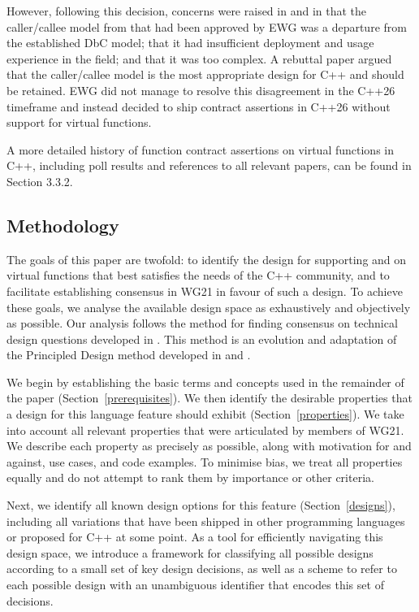 However, following this decision, concerns were raised in \cite{P3506R0} and in \cite{P3573R0} that the caller/callee model from \cite{P3097R0} that had been approved by EWG was a departure from the established DbC model; that it had insufficient deployment and usage experience in the field; and that it was too complex. A rebuttal paper \cite{P3506R0} argued that the caller/callee model is the most appropriate design for C++ and should be retained. EWG did not manage to resolve this disagreement in the C++26 timeframe and instead decided to ship contract assertions in C++26 without support for virtual functions.

A more detailed history of function contract assertions on virtual functions in C++, including poll results and references to all relevant papers, can be found in \cite{P2899R1} Section 3.3.2.

\subsection{Methodology}

The goals of this paper are twofold: to identify the design for supporting  and  on virtual functions that best satisfies the needs of the C++ community, and to facilitate establishing consensus in WG21 in favour of such a design. To achieve these goals, we analyse the available design space as exhaustively and objectively as possible. Our analysis follows the method for finding consensus on technical design questions developed in \cite{P3850R0}. This method is an evolution and adaptation of the Principled Design method developed in \cite{P3004R0} and \cite{P3005R0}.

We begin by establishing the basic terms and concepts used in the remainder of the paper (Section~\ref{prerequisites}). We then identify the desirable properties that a design for this language feature should exhibit (Section~\ref{properties}). We take into account all relevant properties that were articulated by members of WG21. We describe each property as precisely as possible, along with motivation for and against, use cases, and code examples. To minimise bias, we treat all properties equally and do not attempt to rank them by importance or other criteria.

Next, we identify all known design options for this feature (Section~\ref{designs}), including all variations that have been shipped in other programming languages or proposed for C++ at some point. As a tool for efficiently navigating this design space, we introduce a framework for classifying all possible designs according to a small set of key design decisions, as well as a scheme to refer to each possible design with an unambiguous identifier that encodes this set of decisions.

